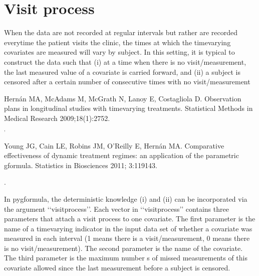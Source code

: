\documentclass[letterpaper,10pt,english]{sphinxmanual}
\begin{document}
\section{Visit process}
\label{\detokenize{Specifications/Visit process:visit-process}}\label{\detokenize{Specifications/Visit process:id1}}\label{\detokenize{Specifications/Visit process::doc}}
\sphinxAtStartPar
When the data are not recorded at regular intervals but rather are recorded everytime the patient visits the
clinic, the times at which the time\sphinxhyphen{}varying covariates are measured will vary by subject. In this setting,
it is typical to construct the data such that (i) at a time when there is no visit/measurement,
the last measured value of a covariate is carried forward, and (ii) a subject is censored after a certain number of consecutive times
with no visit/measurement \sphinxstepexplicit %
\begin{footnote}[1]\label{\thesphinxscope.1}%
\sphinxAtStartFootnote
Hernán MA, McAdams M, McGrath N, Lanoy E, Costagliola D. Observation plans in longitudinal studies with
time\sphinxhyphen{}varying treatments. Statistical Methods in Medical Research 2009;18(1):27\sphinxhyphen{}52.
%
\end{footnote} $^{\text{,}}$ \sphinxstepexplicit %
\begin{footnote}[2]\label{\thesphinxscope.2}%
\sphinxAtStartFootnote
Young JG, Cain LE, Robins JM, O’Reilly E, Hernán MA. Comparative effectiveness of dynamic treatment regimes:
an application of the parametric g\sphinxhyphen{}formula. Statistics in Biosciences 2011; 3:119\sphinxhyphen{}143.
%
\end{footnote}.

\sphinxAtStartPar
In pygformula, the deterministic knowledge (i) and (ii) can be incorporated via the argument ‘‘visitprocess’’.
Each vector in ‘‘visitprocess’’ contains three parameters that attach a visit process to one covariate.
The first parameter is the name of a time\sphinxhyphen{}varying indicator in the input data set of whether a covariate was measured in each interval
(1 means there is a visit/measurement, 0 means there is no visit/measurement).
The second parameter is the name of the covariate. The third parameter is the maximum number s of missed measurements of this covariate allowed
since the last measurement before a subject is censored.
\end{document}
